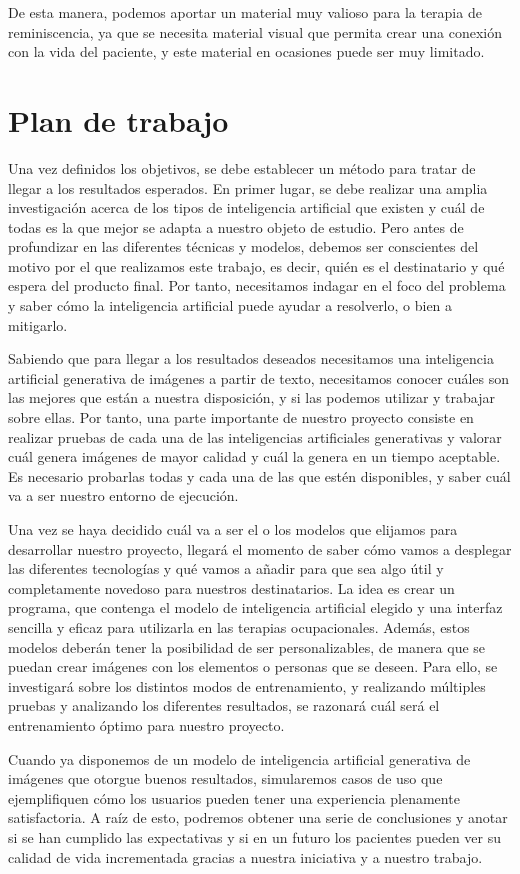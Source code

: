 De esta manera, podemos aportar un material muy valioso para la terapia de reminiscencia, ya que se necesita material visual que permita crear una conexión con la vida del paciente, y este material en ocasiones puede ser muy limitado.

\section{Plan de trabajo}

Una vez definidos los objetivos, se debe establecer un método para tratar de llegar a los resultados esperados. En primer lugar, se debe realizar una amplia investigación acerca de los tipos de inteligencia artificial que existen y cuál de todas es la que mejor se adapta a nuestro objeto de estudio. Pero antes de profundizar en las diferentes técnicas y modelos, debemos ser conscientes del motivo por el que realizamos este trabajo, es decir, quién es el destinatario y qué espera del producto final. Por tanto, necesitamos indagar en el foco del problema y saber cómo la inteligencia artificial puede ayudar a resolverlo, o bien a mitigarlo. 

Sabiendo que para llegar a los resultados deseados necesitamos una inteligencia artificial generativa de imágenes a partir de texto, necesitamos conocer cuáles son las mejores que están a nuestra disposición, y si las podemos utilizar y trabajar sobre ellas. Por tanto, una parte importante de nuestro proyecto consiste en realizar pruebas de cada una de las inteligencias artificiales generativas y valorar cuál genera imágenes de mayor calidad y cuál la genera en un tiempo aceptable. Es necesario probarlas todas y cada una de las que estén disponibles, y saber cuál va a ser nuestro entorno de ejecución.

Una vez se haya decidido cuál va a ser el o los modelos que elijamos para desarrollar nuestro proyecto, llegará el momento de saber cómo vamos a desplegar las diferentes tecnologías y qué vamos a añadir para que sea algo útil y completamente novedoso para nuestros destinatarios. La idea es crear un programa, que contenga el modelo de inteligencia artificial elegido y una interfaz sencilla y eficaz para utilizarla en las terapias ocupacionales. Además, estos modelos deberán tener la posibilidad de ser personalizables, de manera que se puedan crear imágenes con los elementos o personas que se deseen. Para ello, se investigará sobre los distintos modos de entrenamiento, y realizando múltiples pruebas y analizando los diferentes resultados, se razonará cuál será el entrenamiento óptimo para nuestro proyecto.

Cuando ya disponemos de un modelo de inteligencia artificial generativa de imágenes que otorgue buenos resultados, simularemos casos de uso que ejemplifiquen cómo los usuarios pueden tener una experiencia plenamente satisfactoria. A raíz de esto, podremos obtener una serie de conclusiones y anotar si se han cumplido las expectativas y si en un futuro los pacientes pueden ver su calidad de vida incrementada gracias a nuestra iniciativa y a nuestro trabajo.


